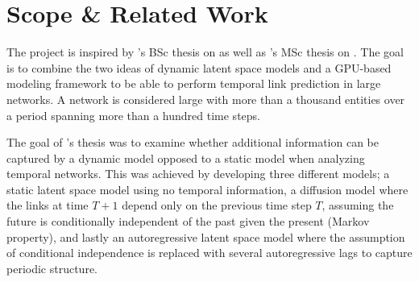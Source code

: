     
    

\section{Scope \& Related Work}

    The project is inspired by \citeauthor{zangenberg2018a}'s BSc thesis \cite{zangenberg2018a} on  as well as \citeauthor{jacobsen2018a}'s MSc thesis \cite{jacobsen2018a} on . 
    The goal is to combine the two ideas of dynamic latent space models and a GPU-based modeling framework to be able to perform temporal link prediction in large networks. A network is considered large with more than a thousand entities over a period spanning more than a hundred time steps.

    The goal of \citeauthor{zangenberg2018a}'s thesis was to examine whether additional information can be captured by a dynamic model opposed to a static model when analyzing temporal networks. This was achieved by developing three different models; a static latent space model using no temporal information, a diffusion model where the links at time $T+1$ depend only on the previous time step $T$, assuming the future is conditionally independent of the past given the present (Markov property), and lastly an autoregressive latent space model where the assumption of conditional independence is replaced with several autoregressive lags to capture periodic structure.
    
